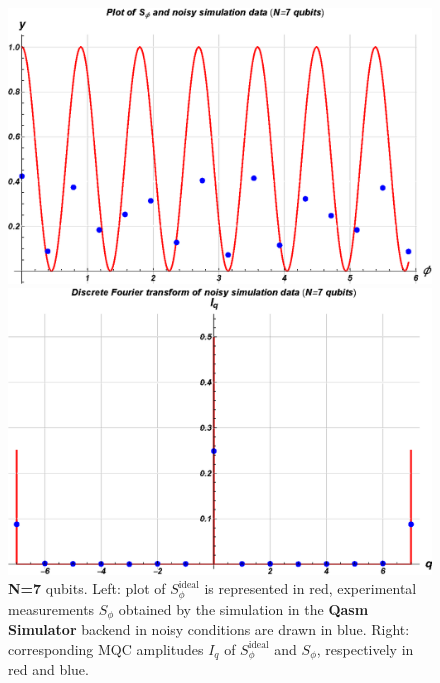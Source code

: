 \vspace{0.3cm}

\begin{figure}[h!]
\begin{minipage}[c]{0.5\linewidth}
\hspace{1cm}
\centering \includegraphics[width=1\textwidth]{./chapter3/graphics_IBM/simulation/7S_noise.eps}
\end{minipage}
\begin{minipage}[]{0.5\linewidth}
\centering \includegraphics[width=1\textwidth]{./chapter3/graphics_IBM/simulation/7I_noise.eps}
\end{minipage}
\caption{\label{NoiseSimulation7} \textbf{N=7} qubits. Left:  plot of $S_{\phi}^{\text{ideal}}$ is represented in red, experimental measurements $S_{\phi}$ obtained by the simulation in the \textbf{Qasm Simulator} backend in noisy conditions are drawn in blue. Right: corresponding MQC amplitudes $I_q$ of $S_\phi^{\text{ideal}}$ and $S_\phi$, respectively in red and blue.}
\end{figure}


